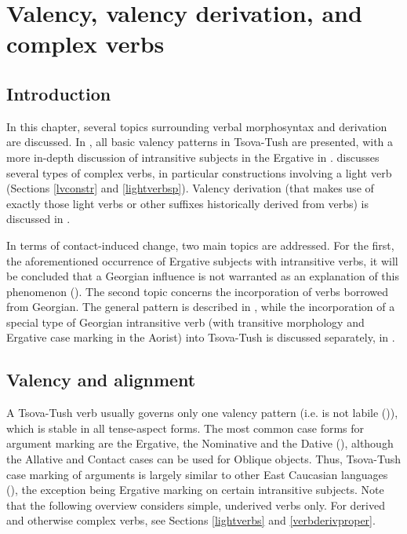 \chapter{Valency, valency derivation, and complex verbs} \label{derivation}


\section{Introduction}

In this chapter, several topics surrounding verbal morphosyntax and derivation are discussed. In , all basic valency patterns in Tsova-Tush are presented, with a more in-depth discussion of intransitive subjects in the Ergative in .  discusses several types of complex verbs, in particular constructions involving a light verb (Sections \ref{lvconstr} and \ref{lightverbsp}). Valency derivation (that makes use of exactly those light verbs or other suffixes historically derived from verbs) is discussed in . 

In terms of contact-induced change, two main topics are addressed. For the first, the aforementioned occurrence of Ergative subjects with intransitive verbs, it will be concluded that a Georgian influence is not warranted as an explanation of this phenomenon (). The second topic concerns the incorporation of verbs borrowed from Georgian. The general pattern is described in , while the incorporation of a special type of Georgian intransitive verb (with transitive morphology and Ergative case marking in the Aorist) into Tsova-Tush is discussed separately, in .




\section{Valency and alignment} \label{valency}

A Tsova-Tush verb usually governs only one valency pattern (i.e. is not labile (\cite[193]{holiskygagua})), which is stable in all tense-aspect forms. The most common case forms for argument marking are the Ergative, the Nominative and the Dative (\cite{chrelashvili87}), although the Allative and Contact cases can be used for Oblique objects. Thus, Tsova-Tush case marking of arguments is largely similar to other East Caucasian languages (\cite{forker17ergativity}), the exception being Ergative marking on certain intransitive subjects. Note that the following overview considers simple, underived verbs only. For derived and otherwise complex verbs, see Sections  \ref{lightverbs} and \ref{verbderivproper}.


